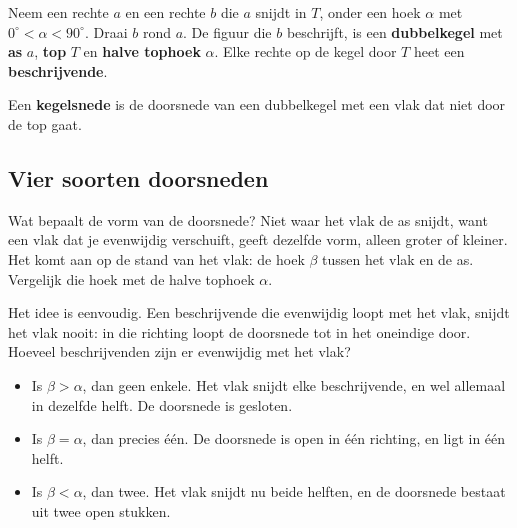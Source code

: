 \begin{theorie}
\begin{minipage}[t]{.64\linewidth}
\vspace{0pt}
Neem een rechte $a$ en een rechte $b$ die $a$ snijdt in $T$, onder een hoek $\alpha$ met $0^\circ < \alpha < 90^\circ$. Draai $b$ rond $a$. De figuur die $b$ beschrijft, is een \textbf{\textcolor{accent}{dubbelkegel}} met \textbf{\textcolor{accent}{as}} $a$, \textbf{\textcolor{accent}{top}} $T$ en \textbf{\textcolor{accent}{halve tophoek}} $\alpha$. Elke rechte op de kegel door $T$ heet een \textbf{\textcolor{accent}{beschrijvende}}.

\vspace{1.5mm}
Een \textbf{\textcolor{accent}{kegelsnede}} is de doorsnede van een dubbelkegel met een vlak dat niet door de top gaat.
\end{minipage}\hfill
\begin{minipage}[t]{.32\linewidth}
\vspace{0pt}
\centering
{}
\end{minipage}
\end{theorie}

\subsection{Vier soorten doorsneden}

Wat bepaalt de vorm van de doorsnede? Niet waar het vlak de as snijdt, want een vlak dat je evenwijdig verschuift, geeft dezelfde vorm, alleen groter of kleiner. Het komt aan op de stand van het vlak: de hoek $\beta$ tussen het vlak en de as. Vergelijk die hoek met de halve tophoek $\alpha$.

Het idee is eenvoudig. Een beschrijvende die evenwijdig loopt met het vlak, snijdt het vlak nooit: in die richting loopt de doorsnede tot in het oneindige door. Hoeveel beschrijvenden zijn er evenwijdig met het vlak?

\begin{itemize}
\item Is $\beta > \alpha$, dan geen enkele. Het vlak snijdt elke beschrijvende, en wel allemaal in dezelfde helft. De doorsnede is gesloten.
\item Is $\beta = \alpha$, dan precies één. De doorsnede is open in één richting, en ligt in één helft.
\item Is $\beta < \alpha$, dan twee. Het vlak snijdt nu beide helften, en de doorsnede bestaat uit twee open stukken.
\end{itemize}

